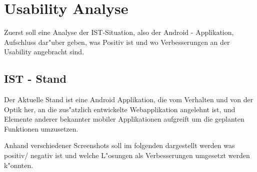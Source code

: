 \section{Usability Analyse}

Zuerst soll eine Analyse der IST-Situation, also der Android - Applikation, Aufschluss dar"uber geben, was Positiv ist und wo Verbesserungen an der Usability angebracht sind. 

\subsection{IST - Stand}
Der Aktuelle Stand ist eine Android Applikation, die  vom Verhalten und von der Optik her, an die zus"atzlich entwickelte Webapplikation angelehnt ist, und Elemente anderer bekannter mobiler Applikationen aufgreift um die geplanten Funktionen umzusetzen. 

Anhand verschiedener Screenshots soll im folgenden dargestellt werden was positiv/ negativ ist  und welche L"osungen als Verbesserungen umgesetzt werden k"onnten. 

